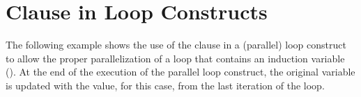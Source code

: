 \section{ Clause in Loop Constructs}
\label{sec:linear_in_loop}

The following example shows the use of the  clause in a (parallel) loop construct to allow the proper parallelization of a loop that contains an induction variable ().  At the end of the execution of the parallel loop construct, the original variable  is updated with the value,  for this case, from the last iteration of the loop.




